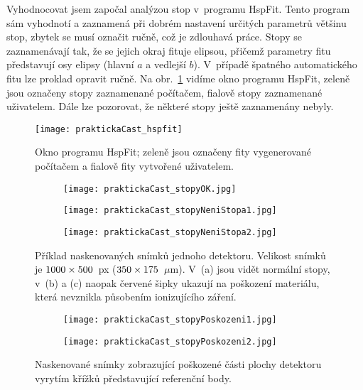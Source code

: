 Vyhodnocovat jsem započal analýzou stop v~programu HspFit. Tento program sám vyhodnotí a zaznamená při dobrém nastavení určitých parametrů většinu stop, zbytek se musí označit ručně, což je zdlouhavá práce. Stopy se zaznamenávají tak, že se jejich okraj fituje elipsou, přičemž parametry fitu představují osy elipsy (hlavní $a$ a vedlejší $b$). V~případě špatného automatického fitu lze proklad opravit ručně. Na obr.~\ref{fig:praktickaCast_hspfit} vidíme okno programu HspFit, zeleně jsou označeny stopy zaznamenané počítačem, fialově stopy zaznamenané uživatelem. Dále lze pozorovat, že některé stopy ještě zaznamenány nebyly. 
\begin{figure}[ht]
  \centering
  \texttt{[image: praktickaCast\_hspfit]}
  \caption{Okno programu HspFit; zeleně jsou označeny fity vygenerované počítačem a fialově fity vytvořené uživatelem.~\cite{dosis_HSP1000}}
  \label{fig:praktickaCast_hspfit}
\end{figure}
\begin{figure}[p]
  \centering
  \begin{subfigure}{0.7\textwidth}
	\texttt{[image: praktickaCast\_stopyOK.jpg]}
	\caption{}
  \end{subfigure}
  \begin{subfigure}{0.7\textwidth}
	\texttt{[image: praktickaCast\_stopyNeniStopa1.jpg]}
	\caption{}
  \end{subfigure}
  \begin{subfigure}{0.7\textwidth}
	\texttt{[image: praktickaCast\_stopyNeniStopa2.jpg]}
	\caption{}
  \end{subfigure}
  \caption{Příklad naskenovaných snímků jednoho detektoru. Velikost snímků je $1000\times\nobreak500$~px ($350\times\nobreak175$~$\mu$m). V~(a) jsou vidět normální stopy, v~(b) a (c) naopak červené šipky ukazují na poškození materiálu, která nevznikla působením ionizujícího záření.}
  \label{fig:praktickaCast_stopy}
\end{figure}
\begin{figure}[ht]
  \centering
  \begin{subfigure}{0.7\textwidth}
	\texttt{[image: praktickaCast\_stopyPoskozeni1.jpg]}
	\caption{}
  \end{subfigure}
  \begin{subfigure}{0.7\textwidth}
	\texttt{[image: praktickaCast\_stopyPoskozeni2.jpg]}
	\caption{}
  \end{subfigure}
  \caption{Naskenované snímky zobrazující poškozené části plochy detektoru vyrytím křížků představující referenční body.}
  \label{fig:praktickaCast_stopyPoskozeni}
\end{figure}

